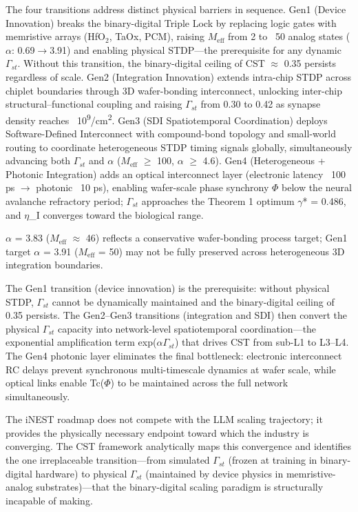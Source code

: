 \documentclass[a4paper,12pt]{article}
\providecommand{\textsubscript}[1]{\ensuremath{_{\text{#1}}}}
\begin{document}
The four transitions address distinct physical barriers in sequence.
Gen1 (Device Innovation) breaks the binary-digital Triple Lock by replacing logic gates with memristive arrays (HfO\textsubscript{2}, TaOx, PCM), raising $M_{\text{eff}}$ from 2 to ~50 analog states ($\alpha$: 0.69$\rightarrow$3.91) and enabling physical STDP---the prerequisite for any dynamic $\Gamma_{st}$.
Without this transition, the binary-digital ceiling of CST $\approx$ 0.35 persists regardless of scale.
Gen2 (Integration Innovation) extends intra-chip STDP across chiplet boundaries through 3D wafer-bonding interconnect, unlocking inter-chip structural--functional coupling and raising $\Gamma_{st}$ from 0.30 to 0.42 as synapse density reaches ~10\textsuperscript{9}/cm\textsuperscript{2}.
Gen3 (SDI Spatiotemporal Coordination) deploys Software-Defined Interconnect with compound-bond topology and small-world routing to coordinate heterogeneous STDP timing signals globally, simultaneously advancing both $\Gamma_{st}$ and $\alpha$ ($M_{\text{eff}}$ $\geq$ 100, $\alpha$ $\geq$ 4.6).
Gen4 (Heterogeneous + Photonic Integration) adds an optical interconnect layer (electronic latency ~100 ps $\rightarrow$ photonic ~10 ps), enabling wafer-scale phase synchrony $\Phi$ below the neural avalanche refractory period; $\Gamma_{st}$ approaches the Theorem 1 optimum $\gamma$* = 0.486, and $\eta$_I converges toward the biological range.


 $\alpha$ = 3.83 ($M_{\text{eff}}$ $\approx$ 46) reflects a conservative wafer-bonding process target; Gen1 target $\alpha$ = 3.91 ($M_{\text{eff}}$ = 50) may not be fully preserved across heterogeneous 3D integration boundaries.


The Gen1 transition (device innovation) is the prerequisite: without physical STDP, $\Gamma_{st}$ cannot be dynamically maintained and the binary-digital ceiling of 0.35 persists.
The Gen2--Gen3 transitions (integration and SDI) then convert the physical $\Gamma_{st}$ capacity into network-level spatiotemporal coordination---the exponential amplification term exp($\alpha$\cdot$\Gamma_{st}$) that drives CST from sub-L1 to L3--L4.
The Gen4 photonic layer eliminates the final bottleneck: electronic interconnect RC delays prevent synchronous multi-timescale dynamics at wafer scale, while optical links enable Tc($\Phi$) to be maintained across the full network simultaneously.


The iNEST roadmap does not compete with the LLM scaling trajectory; it provides the physically necessary endpoint toward which the industry is converging.
The CST framework analytically maps this convergence and identifies the one irreplaceable transition---from simulated $\Gamma_{st}$ (frozen at training in binary-digital hardware) to physical $\Gamma_{st}$ (maintained by device physics in memristive-analog substrates)---that the binary-digital scaling paradigm is structurally incapable of making.
\end{document}
